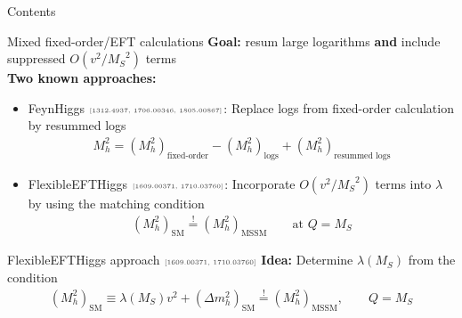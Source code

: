 \documentclass[hyperref={pdfpagelabels=false},ngerman]{beamer}
\newcommand{\MS}{\ensuremath{M_S}}
\newcommand{\mycite}[1]{\ensuremath{\text{\textcolor{darkgray}{\tiny [#1]}}}}
\renewcommand{\emph}{\textbf}
\newcommand{\SM}{\ensuremath{\text{SM}}}
\newcommand{\MSSM}{\ensuremath{\text{MSSM}}}
\begin{document}
\begin{frame}{Contents}
\end{frame}

\begin{frame}{Mixed fixed-order/EFT calculations}
  \emph{Goal:} resum large logarithms \emph{and} include suppressed
  $O(v^2/\MS^2)$ terms
  \\[2em]
  \emph{Two known approaches:}
  \begin{itemize}
  \item FeynHiggs \mycite{1312.4937, 1706.00346, 1805.00867}: Replace logs from
    fixed-order calculation by resummed logs
    \begin{align*}
      M_h^2 = (M_h^2)_{\text{fixed-order}} - (M_h^2)_{\text{logs}} + (M_h^2)_{\text{resummed logs}}
    \end{align*}
  \item FlexibleEFTHiggs \mycite{1609.00371, 1710.03760}: Incorporate
    $O(v^2/\MS^2)$ terms into $\lambda$ by using the matching
    condition
    \begin{align*}
      (M_h^2)_{\SM} \overset{!}{=} (M_h^2)_{\MSSM} \qquad \text{at } Q = \MS
    \end{align*}
  \end{itemize}
\end{frame}

\begin{frame}{FlexibleEFTHiggs approach \mycite{1609.00371, 1710.03760}}
  \emph{Idea:}
  Determine $\lambda(\MS)$ from the condition
  \begin{align*}
    (M_h^2)_{\SM} \equiv \lambda(\MS) v^2 + (\Delta m_h^2)_{\SM} \overset{!}{=} (M_h^2)_{\MSSM} , \qquad Q = \MS
  \end{align*}
  \begin{center}
  \end{center}
\end{frame}
\end{document}
